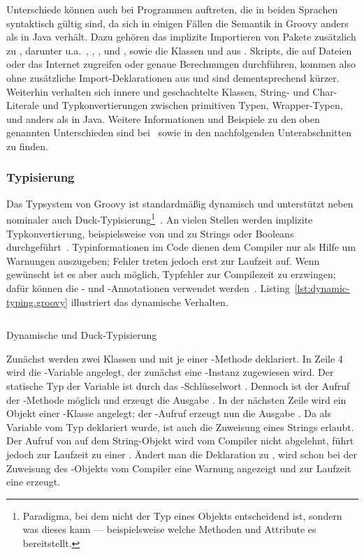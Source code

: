 \documentclass[a4paper]{article}
\newcommand{\codelisting}[3]{
\begin{listing}[ht]
	\inputminted{#1}{#1/#2}
	\vspace{-3ex}
	\caption{#3}
	\label{lst:#2}
\end{listing}
}
\begin{document}
Unterschiede können auch bei Programmen auftreten, die in beiden Sprachen syntaktisch gültig sind, da sich in einigen Fällen die Semantik in Groovy anders als in Java verhält.
Dazu gehören das implizite Importieren von Pakete zusätzlich zu , darunter u.a.~, , ,  und , sowie die Klassen  und  aus .
Skripts, die auf Dateien oder das Internet zugreifen oder genaue Berechnungen durchführen, kommen also ohne zusätzliche Import-Deklarationen aus und sind dementsprechend kürzer.
Weiterhin verhalten sich innere und geschachtelte Klassen, String- und Char-Literale und Typkonvertierungen zwischen primitiven Typen, Wrapper-Typen,  und  anders als in Java.
Weitere Informationen und Beispiele zu den oben genannten Unterschieden sind bei~\cite{groovy-lang:differences} sowie in den nachfolgenden Unterabschnitten zu finden.

\subsubsection{Typisierung}\label{subsubsec:typisierung}

Das Typsystem von Groovy ist standardmäßig dynamisch und unterstützt neben nominaler auch Duck-Typisierung\footnote{Paradigma, bei dem nicht der Typ eines Objekts entscheidend ist, sondern was dieses kann --- beispielsweise welche Methoden und Attribute es bereitstellt.}~\cite[Abs.~6.]{groovy-lang:semantics}.
An vielen Stellen werden implizite Typkonvertierung, beispielsweise von und zu Strings oder Booleans durchgeführt~\cite[Abs.~3.]{groovy-lang:semantics}.
Typinformationen im Code dienen dem Compiler nur als Hilfe um Warnungen auszugeben; Fehler treten jedoch erst zur Laufzeit auf.
Wenn gewünscht ist es aber auch möglich, Typfehler zur Compilezeit zu erzwingen; dafür können die - und -Annotationen verwendet werden~\cite[Abs.~6.2.]{groovy-lang:semantics}.
Listing~\ref{lst:dynamic-typing.groovy} illustriert das dynamische Verhalten.

\codelisting{groovy}{dynamic-typing.groovy}{Dynamische und Duck-Typisierung}

Zunächst werden zwei Klassen  und  mit je einer -Methode deklariert.
In Zeile 4 wird die -Variable angelegt, der zunächst eine -Instanz zugewiesen wird.
Der statische Typ der Variable ist durch das -Schlüsselwort .
Dennoch ist der Aufruf der -Methode möglich und erzeugt die Ausgabe .
In der nächsten Zeile wird ein Objekt einer -Klasse angelegt; der -Aufruf erzeugt nun die Ausgabe .
Da  als Variable vom Typ  deklariert wurde, ist auch die Zuweisung eines Strings erlaubt.
Der Aufruf von  auf dem String-Objekt wird vom Compiler nicht abgelehnt, führt jedoch zur Laufzeit zu einer .
Ändert man die Deklaration zu , wird schon bei der Zuweisung des -Objekts vom Compiler eine Warnung angezeigt und zur Laufzeit eine  erzeugt.
\end{document}
